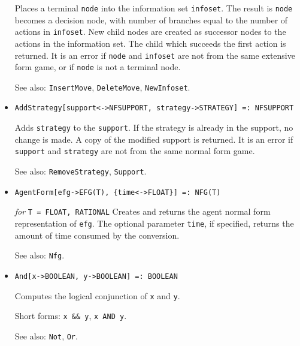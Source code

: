 \begin{itemize}
\bd
Places a terminal \verb+node+ into the information set
\verb+infoset+.  The result is \verb+node+ becomes a decision node,
with number of branches equal to the number of actions in \verb+infoset+.
New child nodes are created as successor nodes to the actions in the
information set.  The child which succeeds the first action is returned.
It is an error if \verb+node+ and \verb+infoset+ are not from the same
extensive form game, or if \verb+node+ is not a terminal node.

\item [See also:] \verb+InsertMove+, \verb+DeleteMove+,
\verb+NewInfoset+.  
\ed

\item{}
\protect \large \begin{verbatim}
AddStrategy[support<->NFSUPPORT, strategy->STRATEGY] =: NFSUPPORT
\end{verbatim}\normalsize

\bd
Adds \verb+strategy+ to the \verb+support+.  If the strategy is already
in the support, no change is made.  A copy of the modified support is
returned.  It is an error if \verb+support+ and \verb+strategy+ are not
from the same normal form game.

\item [See also:] \verb+RemoveStrategy+, \verb+Support+.
\ed

\item{}
\protect \large \begin{verbatim}
AgentForm[efg->EFG(T), {time<->FLOAT}] =: NFG(T)
\end{verbatim}\normalsize

{\it for} {\tt T = FLOAT, RATIONAL}
\bd
Creates and returns the agent normal form representation of \verb+efg+.
The optional parameter \verb+time+, if specified, returns the amount
of time consumed by the conversion.

\item [See also:] \verb+Nfg+.
\ed

\item{} 
\protect \large \begin{verbatim}
And[x->BOOLEAN, y->BOOLEAN] =: BOOLEAN
\end{verbatim} \normalsize

\bd
Computes the logical conjunction of \verb+x+ and \verb+y+.
\item [Short forms:] \verb+x && y+, \verb+x AND y+.
\item [See also:] \verb+Not+, \verb+Or+.
\ed




\end{itemize}
